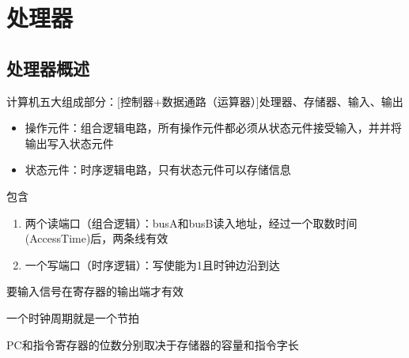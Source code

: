 
\section{处理器}
\subsection{处理器概述}
计算机五大组成部分：[控制器+数据通路（运算器）]处理器、存储器、输入、输出
\begin{itemize}
	\item 操作元件：组合逻辑电路，所有操作元件都必须从状态元件接受输入，并并将输出写入状态元件
	\item 状态元件：时序逻辑电路，只有状态元件可以存储信息
\end{itemize}
\begin{definition}
包含
\begin{enumerate}
\item 两个读端口（组合逻辑）：busA和busB读入地址，经过一个取数时间(AccessTime)后，两条线有效
\item 一个写端口（时序逻辑）：写使能为1且时钟边沿到达
\end{enumerate}
要输入信号在寄存器的输出端才有效
\end{definition}
一个时钟周期就是一个节拍
\par PC和指令寄存器的位数分别取决于存储器的容量和指令字长


